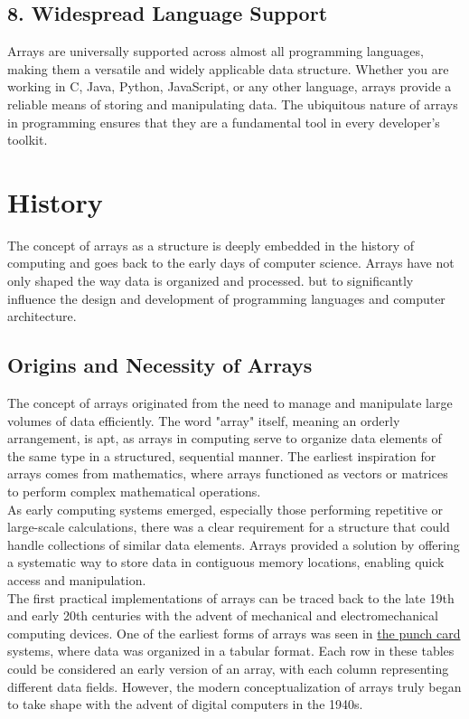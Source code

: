 \documentclass[12pt, oneside]{book}
\begin{document}
\subsection{8. Widespread Language Support}

Arrays are universally supported across almost all programming languages, making them a versatile and widely applicable data structure. Whether you are working in C, Java, Python, JavaScript, or any other language, arrays provide a reliable means of storing and manipulating data. The ubiquitous nature of arrays in programming ensures that they are a fundamental tool in every developer's toolkit.

\section{History}
	
The concept of arrays as a structure is deeply embedded in the history of computing and goes back to the early days of computer science. Arrays have not only shaped the way data is organized and processed. but to significantly influence the design and development of programming languages ​​and computer architecture.
	
\subsection{Origins and Necessity of Arrays}
	
The concept of arrays originated from the need to manage and manipulate large volumes of data efficiently. The word "array" itself, meaning an orderly arrangement, is apt, as arrays in computing serve to organize data elements of the same type in a structured, sequential manner. The earliest inspiration for arrays comes from mathematics, where arrays functioned as vectors or matrices to perform complex mathematical operations.\\As early computing systems emerged, especially those performing repetitive or large-scale calculations, there was a clear requirement for a structure that could handle collections of similar data elements. Arrays provided a solution by offering a systematic way to store data in contiguous memory locations, enabling quick access and manipulation.\\The first practical implementations of arrays can be traced back to the late 19th and early 20th centuries with the advent of mechanical and electromechanical computing devices. One of the earliest forms of arrays was seen in \href{https://en.wikipedia.org/wiki/Punched_card}{the punch card} systems, where data was organized in a tabular format. Each row in these tables could be considered an early version of an array, with each column representing different data fields. However, the modern conceptualization of arrays truly began to take shape with the advent of digital computers in the 1940s.
	
\end{document}
